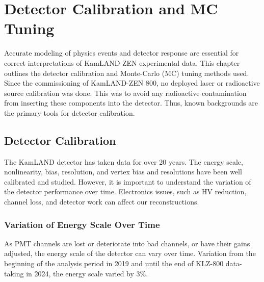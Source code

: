 \chapter{Detector Calibration and MC Tuning}
\label{chapter:calibartion}
\thispagestyle{myheadings}
\graphicspath{{4_Chapter_Calibration/Figures/}}

Accurate modeling of physics events and detector response are essential for correct interpretations of KamLAND-ZEN experimental data. This chapter outlines the detector calibration and Monte-Carlo (MC) tuning methods used. Since the commissioning of KamLAND-ZEN 800, no deployed laser or radioactive source calibration was done. This was to avoid any radioactive contamination from inserting these components into the detector. Thus, known backgrounds are the primary tools for detector calibration.
\cite{klz800_arxiv}

\section{Detector Calibration}
The KamLAND detector has taken data for over 20 years. The energy scale, nonlinearity, bias, resolution, and vertex bias and resolutions have been well calibrated and studied. However, it is important to understand the variation of the detector performance over time. Electronics issues, such as HV reduction, channel loss, and detector work can affect our reconstructions. 
\subsection{Variation of Energy Scale Over Time}
As PMT channels are lost or deteriotate into bad channels, or have their gains adjusted, the energy scale of the detector can vary over time. Variation from the beginning of the analysis period in 2019 and until the end of KLZ-800 data-taking in 2024, the energy scale varied by 3\%. 

